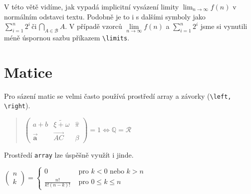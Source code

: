 \documentclass[a4 paper,11pt]{article}
\theoremstyle{definition}
\theoremstyle{plain}
\begin{document}
V této větě vidíme, jak vypadá implicitní vysázení limity $\lim_{n \to \infty} f(n)$ v normálním odstavci textu. Podobně je to i s dalšími symboly jako $\sum_{i=1}^{n} 2^{i} \, \text {či} \,  \bigcap_{A \in \mathcal{B}} A$. V případě vzorců $\lim\limits _{n \rightarrow \infty} f(n)$ a $\sum\limits_{i=1}^n 2^i$ jsme si vynutili méně úspornou sazbu příkazem \verb|\limits|.


\section{Matice}

Pro sázení matic se velmi často používá prostředí array a závorky (\verb|\left, \right|).


\begin{quote}
    


\quad
$\left(\begin{array}{ccc}
a+b & \widetilde{\xi+\omega} & \hat{\pi} \\
\vec{\mathbf{a}} & \stackrel{\longrightarrow}{A C} & \beta
\end{array}\right)=1 \Longleftrightarrow \mathbb{Q}=\mathcal{R}$

\end{quote}

Prostředí \verb|array| lze úspěšně využít i jinde.





\vspace{0.618cm}

    
\quad$\left(\begin{array}{l}
n \\
k
\end{array}\right)=\left\{\begin{array}{cl}
0 & \text { pro } k<0 \text { nebo } k>n \\
\frac{n !}{k !(n-k) !} & \text { pro } 0 \leq k \leq n
\end{array}\right.$

    
\vspace{0.382cm}
\end{document}

